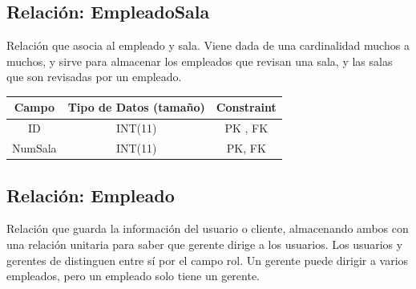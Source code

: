 \documentclass[12pt, fleqn]{report}                             %
\begin{document}
        \subsection*{Relación: EmpleadoSala}

            Relación que asocia al empleado y sala. Viene dada de una cardinalidad
            muchos a muchos, y sirve para almacenar los empleados que revisan una sala,
            y las salas que son revisadas por un empleado.

            \vspace{2em}

            \small{
            \begin{tabular}{| c | c | c |}
                \hline
                \textbf{Campo} & \textbf{Tipo de Datos (tamaño)} & \textbf{Constraint} \\[0.5ex] 
                \hline\hline
                
                ID          & INT(11)       & PK , FK               \\
                NumSala     & INT(11)       & PK, FK                \\
                \hline
            \end{tabular}
            }


        \clearpage
        \subsection*{Relación: Empleado}

            Relación que guarda la información del usuario o cliente, almacenando ambos
            con una relación unitaria para saber que gerente dirige a los usuarios.
            Los usuarios y gerentes de distinguen entre sí por el campo rol.
            Un gerente puede dirigir a varios empleados, pero un empleado solo tiene un gerente.

            \vspace{2em}
\end{document}
